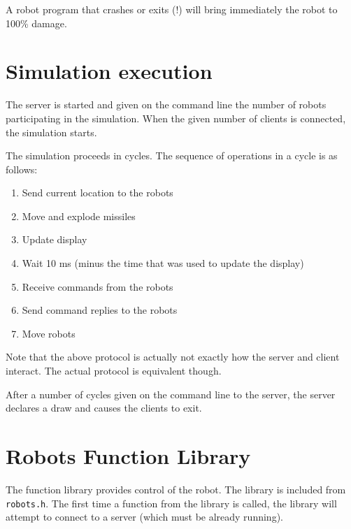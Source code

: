 \documentclass{article}
\begin{document}
        A robot program that crashes or exits (!) will bring immediately
        the robot to 100\% damage.

\section{Simulation execution}

        The server is started and given on the command line the number of
        robots participating in the simulation.  When the given number of
        clients is connected, the simulation starts.

        The simulation proceeds in cycles.  The sequence of operations in
        a cycle is as follows:
        \begin{enumerate}
        \item Send current location to the robots
        \item Move and explode missiles
        \item Update display
        \item Wait 10 ms (minus the time that was used to update the display)
        \item Receive commands from the robots
        \item Send command replies to the robots
        \item Move robots
        \end{enumerate}

        Note that the above protocol is actually not exactly
        how the server and client interact.  The actual protocol is equivalent
	though.

        After a number of cycles given on the command line to the server,
        the server declares a draw and causes the clients to exit.

\section{Robots Function Library}

        The function library provides control of the robot.  The library
        is included from \texttt{robots.h}.  The first time a function from
        the library is called, the library will attempt to connect to a server
        (which must be already running).
\end{document}
